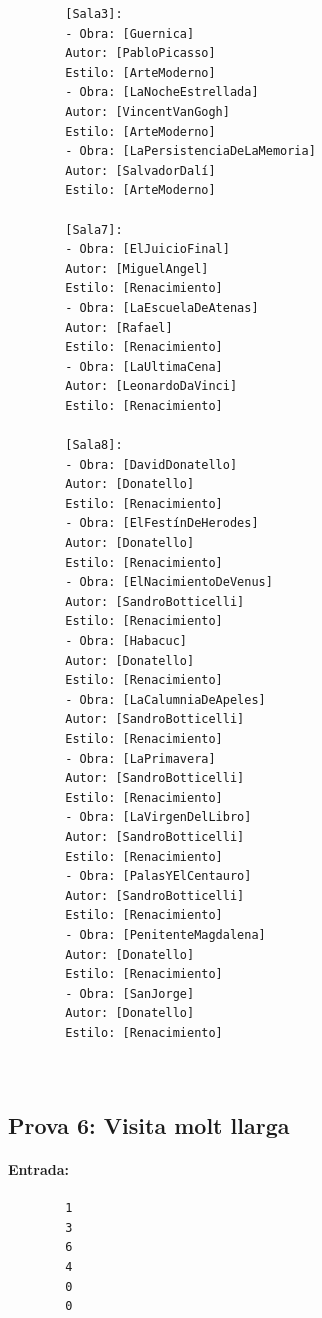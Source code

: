 \documentclass[a4paper]{article}
\begin{document}
\begin{verbatim}
		[Sala3]:
		- Obra: [Guernica]
		Autor: [PabloPicasso]
		Estilo: [ArteModerno]
		- Obra: [LaNocheEstrellada]
		Autor: [VincentVanGogh]
		Estilo: [ArteModerno]
		- Obra: [LaPersistenciaDeLaMemoria]
		Autor: [SalvadorDalí]
		Estilo: [ArteModerno]
		
		[Sala7]:
		- Obra: [ElJuicioFinal]
		Autor: [MiguelAngel]
		Estilo: [Renacimiento]
		- Obra: [LaEscuelaDeAtenas]
		Autor: [Rafael]
		Estilo: [Renacimiento]
		- Obra: [LaUltimaCena]
		Autor: [LeonardoDaVinci]
		Estilo: [Renacimiento]
		
		[Sala8]:
		- Obra: [DavidDonatello]
		Autor: [Donatello]
		Estilo: [Renacimiento]
		- Obra: [ElFestínDeHerodes]
		Autor: [Donatello]
		Estilo: [Renacimiento]
		- Obra: [ElNacimientoDeVenus]
		Autor: [SandroBotticelli]
		Estilo: [Renacimiento]
		- Obra: [Habacuc]
		Autor: [Donatello]
		Estilo: [Renacimiento]
		- Obra: [LaCalumniaDeApeles]
		Autor: [SandroBotticelli]
		Estilo: [Renacimiento]
		- Obra: [LaPrimavera]
		Autor: [SandroBotticelli]
		Estilo: [Renacimiento]
		- Obra: [LaVirgenDelLibro]
		Autor: [SandroBotticelli]
		Estilo: [Renacimiento]
		- Obra: [PalasYElCentauro]
		Autor: [SandroBotticelli]
		Estilo: [Renacimiento]
		- Obra: [PenitenteMagdalena]
		Autor: [Donatello]
		Estilo: [Renacimiento]
		- Obra: [SanJorge]
		Autor: [Donatello]
		Estilo: [Renacimiento]
		
		
	\end{verbatim}
	
	\subsection{Prova 6: Visita molt llarga}
	\paragraph{Entrada:}
	\begin{verbatim}
		1
		3
		6
		4
		0
		0
	\end{verbatim}
\end{document}
